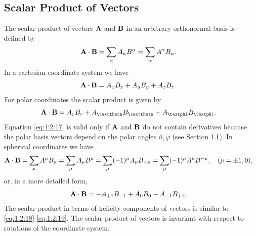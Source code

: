 \subsection{Scalar Product of Vectors}\label{sec:1.2.2}
The scalar product of vectors \(\mathbf{A}\) and \(\mathbf{B}\) in an arbitrary orthonormal basis is defined by
\begin{equation}
\mathbf{A} \cdot \mathbf{B}=\sum_{\alpha} A_{\alpha} B^{\alpha}=\sum_{\alpha} A^{\alpha} B_{\alpha}. \label{eq:1:2:15}
\end{equation}
In a cartesian coordinate system we have
\begin{equation}
\mathbf{A} \cdot \mathbf{B}=A_{x} B_{x}+A_{y} B_{y}+A_{z} B_{z}. \label{eq:1:2:16}
\end{equation}
For polar coordinates the scalar product is given by
\begin{equation}
\vect{A} \cdot \vect{B}=A_{r} B_{r}+A_{\vartheta} B_{\vartheta}+A_{\varphi} B_{\varphi} . \label{eq:1:2:17}
\end{equation}
Equation \eqref{eq:1:2:17} is valid only if \(\mathbf{A}\) and \(\mathbf{B}\) do not contain derivatives because the polar basis vectors depend on the polar angles \(\vartheta, \varphi\) (see Section 1.1). In spherical coordinates we have
\begin{equation}
\mathbf{A} \cdot \mathbf{B}=\sum_{\mu} A^{\mu} B_{\mu}=\sum_{\mu} A_{\mu} B^{\mu}=\sum_{\mu}(-1)^{\mu} A_{\mu} B_{-\mu}=\sum_{\mu}(-1)^{\mu} A^{\mu} B^{-\mu}, \quad(\mu= \pm 1,0) ,\label{eq:1:2:18}
\end{equation}
or, in a more detailed form,
\begin{equation}
\mathbf{A} \cdot \mathbf{B}=-A_{+1} B_{-1}+A_{0} B_{0}-A_{-1} B_{+1} ,\label{eq:1:2:19}
\end{equation}
The scalar product in terms of helicity components of vectors is similar to \eqref{eq:1:2:18}-\eqref{eq:1:2:19}. The scalar product of vectors is invariant with respect to rotations of the coordinate system.


